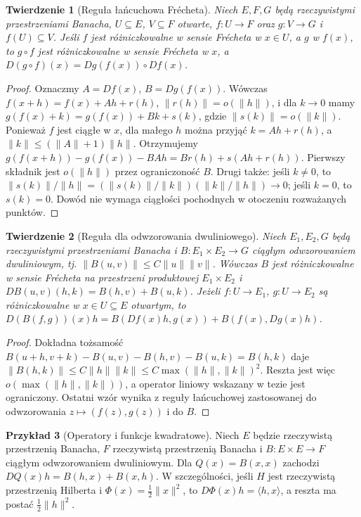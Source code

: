 \documentclass[11pt,a4paper]{article}
\numberwithin{equation}{section}
\theoremstyle{plain}
\newtheorem{twierdzenie}{Twierdzenie}[section]
\theoremstyle{definition}
\newtheorem{przyklad}[twierdzenie]{Przykład}
\theoremstyle{remark}
\begin{document}
\begin{twierdzenie}[Reguła łańcuchowa Frécheta]
\label{thm:chain14}
Niech $E,F,G$ będą rzeczywistymi przestrzeniami Banacha, $U\subseteq E$, $V\subseteq F$ otwarte, $f:U\to F$ oraz $g:V\to G$ i $f(U)\subseteq V$. Jeśli $f$ jest różniczkowalne w sensie Frécheta w $x\in U$, a $g$ w $f(x)$, to $g\circ f$ jest różniczkowalne w sensie Frécheta w $x$, a
$D(g\circ f)(x)=Dg(f(x))\circ Df(x)$.
\end{twierdzenie}
\begin{proof}
Oznaczmy $A=Df(x)$, $B=Dg(f(x))$. Wówczas $f(x+h)=f(x)+Ah+r(h)$, $\|r(h)\|=o(\|h\|)$, i dla $k\to0$ mamy $g(f(x)+k)=g(f(x))+Bk+s(k)$, gdzie $\|s(k)\|=o(\|k\|)$. Ponieważ $f$ jest ciągłe w $x$, dla małego $h$ można przyjąć $k=Ah+r(h)$, a $\|k\|\le(\|A\|+1)\|h\|$. Otrzymujemy
$g(f(x+h))-g(f(x))-BAh=Br(h)+s(Ah+r(h))$.
Pierwszy składnik jest $o(\|h\|)$ przez ograniczoność $B$. Drugi także: jeśli $k\ne0$, to
$\|s(k)\|/\|h\|=(\|s(k)\|/\|k\|)(\|k\|/\|h\|)\to0$;
jeśli $k=0$, to $s(k)=0$. Dowód nie wymaga ciągłości pochodnych w otoczeniu rozważanych punktów.
\end{proof}

\begin{twierdzenie}[Reguła dla odwzorowania dwuliniowego]
\label{thm:bilinear14}
Niech $E_1,E_2,G$ będą rzeczywistymi przestrzeniami Banacha i $B:E_1\times E_2\to G$ ciągłym odwzorowaniem dwuliniowym, tj. $\|B(u,v)\|\le C\|u\|\|v\|$. Wówczas $B$ jest różniczkowalne w sensie Frécheta na przestrzeni produktowej $E_1\times E_2$ i
$DB(u,v)(h,k)=B(h,v)+B(u,k)$.
Jeżeli $f:U\to E_1$, $g:U\to E_2$ są różniczkowalne w $x\in U\subseteq E$ otwartym, to
$D(B(f,g))(x)h=B(Df(x)h,g(x))+B(f(x),Dg(x)h)$.
\end{twierdzenie}
\begin{proof}
Dokładna tożsamość
$B(u+h,v+k)-B(u,v)-B(h,v)-B(u,k)=B(h,k)$
daje $\|B(h,k)\|\le C\|h\|\|k\|\le C\max(\|h\|,\|k\|)^2$. Reszta jest więc $o(\max(\|h\|,\|k\|))$, a operator liniowy wskazany w tezie jest ograniczony. Ostatni wzór wynika z reguły łańcuchowej zastosowanej do odwzorowania $z\mapsto(f(z),g(z))$ i do $B$.
\end{proof}

\begin{przyklad}[Operatory i funkcje kwadratowe]
\label{ex:quadratic14}
Niech $E$ będzie rzeczywistą przestrzenią Banacha, $F$ rzeczywistą przestrzenią Banacha i $B:E\times E\to F$ ciągłym odwzorowaniem dwuliniowym. Dla $Q(x)=B(x,x)$ zachodzi
$DQ(x)h=B(h,x)+B(x,h)$.
W szczególności, jeśli $H$ jest rzeczywistą przestrzenią Hilberta i $\Phi(x)=\frac12\|x\|^2$, to
$D\Phi(x)h=\langle h,x\rangle$, a reszta ma postać $\frac12\|h\|^2$.
\end{przyklad}
\end{document}

